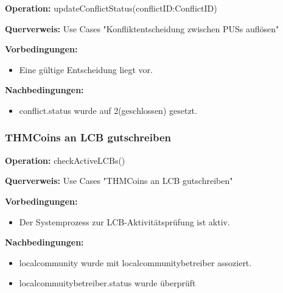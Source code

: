 \documentclass[a4paper,12pt]{article}
\begin{document}
	\begin{contractbox}
		\textbf{Operation:} updateConflictStatus(conflictID:ConflictID)
		
	\textbf{Querverweis:} Use Cases "Konfliktentscheidung zwischen PUSs auflösen"
		
		\textbf{Vorbedingungen:}
		\begin{itemize}[noitemsep]
			\item Eine gültige Entscheidung liegt vor.
		\end{itemize}
		
		\textbf{Nachbedingungen:}
		\begin{itemize}[noitemsep]
			\item conflict.status wurde auf 2(geschlossen) gesetzt.
		\end{itemize}
	\end{contractbox}
	
	
	
	\subsubsection{THMCoins an LCB gutschreiben}
	
	\begin{contractbox}
		\textbf{Operation:} checkActiveLCBs()
		
			\textbf{Querverweis:} Use Cases "THMCoins an LCB gutschreiben"
		
		\textbf{Vorbedingungen:}
		\begin{itemize}[noitemsep]
			\item Der Systemprozess zur LCB-Aktivitätsprüfung ist aktiv.
		\end{itemize}
		
		\textbf{Nachbedingungen:}
		\begin{itemize}[noitemsep]
			\item localcommunity wurde mit localcommunitybetreiber assoziert.
			\item localcommuitybetreiber.status wurde überprüft
		\end{itemize}
	\end{contractbox}
	
\end{document}
